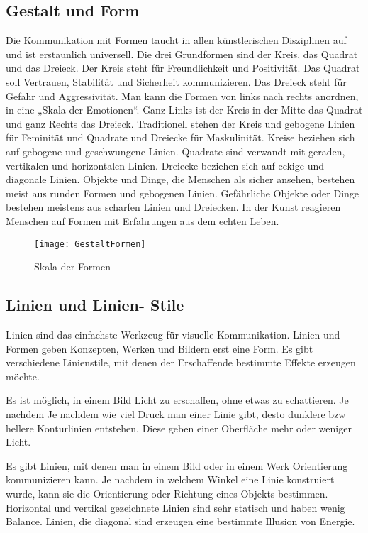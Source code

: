 \subsection{Gestalt und Form}
Die Kommunikation mit Formen taucht in allen künstlerischen Disziplinen auf und ist erstaunlich universell. Die drei Grundformen sind der Kreis, das Quadrat und das Dreieck. Der Kreis steht für Freundlichkeit und Positivität. Das Quadrat soll Vertrauen, Stabilität und Sicherheit kommunizieren. Das Dreieck steht für Gefahr und Aggressivität. Man kann die Formen von links nach rechts anordnen, in eine „Skala der Emotionen“. Ganz Links ist der Kreis in der Mitte das Quadrat und ganz Rechts das Dreieck. Traditionell stehen der Kreis und gebogene Linien für Feminität und Quadrate und Dreiecke für Maskulinität.\cite{_drawing_basics_and_video_game_art}
Kreise beziehen sich auf gebogene und geschwungene Linien. Quadrate sind verwandt mit geraden, vertikalen und horizontalen Linien. Dreiecke beziehen sich auf eckige und diagonale Linien. 
Objekte und Dinge, die Menschen als sicher ansehen, bestehen meist aus runden Formen und gebogenen Linien. Gefährliche Objekte oder Dinge bestehen meistens aus scharfen Linien und Dreiecken. In der Kunst reagieren Menschen auf Formen mit Erfahrungen aus dem echten Leben.
\cite{_drawing_basics_and_video_game_art}

\begin{figure}[H]
	\centering
	\texttt{[image: GestaltFormen]}
	\caption{Skala der Formen\cite{_drawing_basics_and_video_game_art}}
\end{figure}

\subsection{Linien und Linien- Stile}
Linien sind das einfachste Werkzeug für visuelle Kommunikation. Linien und Formen geben Konzepten, Werken und Bildern erst eine Form. Es gibt verschiedene Linienstile, mit denen der Erschaffende bestimmte Effekte erzeugen möchte. 
\cite{_drawing_basics_and_video_game_art}
\cite{_line_color_form}

Es ist möglich, in einem Bild Licht zu erschaffen, ohne etwas zu schattieren. Je nachdem Je nachdem wie viel Druck man einer Linie gibt, desto dunklere bzw hellere Konturlinien entstehen. Diese geben einer Oberfläche mehr oder weniger Licht. 
\cite{_drawing_basics_and_video_game_art}
\cite{_line_color_form}

Es gibt Linien, mit denen man in einem Bild oder in einem Werk Orientierung kommunizieren kann. Je nachdem in welchem Winkel eine Linie konstruiert wurde, kann sie die Orientierung oder Richtung eines Objekts bestimmen. Horizontal und vertikal gezeichnete Linien sind sehr statisch und haben wenig Balance. Linien, die diagonal sind erzeugen eine bestimmte Illusion von Energie.
\cite{_drawing_basics_and_video_game_art}
\cite{_line_color_form}

